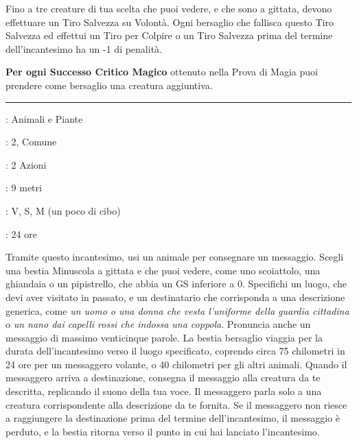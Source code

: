 \begin{multicols}{2}
Fino a tre creature di tua scelta che puoi vedere, e che sono a gittata, devono effettuare un Tiro Salvezza su Volontà. Ogni bersaglio che fallisca questo Tiro Salvezza ed effettui un Tiro per Colpire o un Tiro Salvezza prima del termine dell'incantesimo ha un -1 di penalità.

\textbf{Per ogni Successo Critico Magico} ottenuto nella Prova di Magia puoi prendere come bersaglio una creatura aggiuntiva.

\smallskip\noindent\rule{\linewidth}{2pt} \hypertarget{Animale Messaggero}{}\smallskip{}\label{Animal Messenger}
\noindent
\begin{description}[noitemsep, topsep=0pt, parsep=0pt, partopsep=0pt, leftmargin=0cm, labelwidth=2.8cm]
\item[\textbf{Lista di Magia}]: Animali e Piante
\item[\textbf{Livello}]: 2, Comune
\item[\textbf{T. di Lancio}]: 2 Azioni
\item[\textbf{Gittata}]: 9 metri
\item[\textbf{Componenti}]: V, S, M (un poco di cibo)
\item[\textbf{Durata}]: 24 ore
\end{description}

Tramite questo incantesimo, usi un animale per consegnare un messaggio. Scegli una bestia Minuscola a gittata e che puoi vedere, come uno scoiattolo, una ghiandaia o un pipistrello, che abbia un GS inferiore a 0. Specifichi un luogo, che devi aver visitato in passato, e un destinatario che corrisponda a una descrizione generica, come \emph{un uomo o una donna che vesta l'uniforme della guardia cittadina} o \emph{un nano dai capelli rossi che indossa una coppola}. Pronuncia anche un messaggio di massimo venticinque parole. La bestia bersaglio viaggia per la durata dell'incantesimo verso il luogo specificato, coprendo circa 75 chilometri in 24 ore per un messaggero volante, o 40 chilometri per gli altri animali. Quando il messaggero arriva a destinazione, consegna il messaggio alla creatura da te descritta, replicando il suono della tua voce. Il messaggero parla solo a una creatura corrispondente alla descrizione da te fornita. Se il messaggero non riesce a raggiungere la destinazione prima del termine dell'incantesimo, il messaggio è perduto, e la bestia ritorna verso il punto in cui hai lanciato l'incantesimo.


\end{multicols}
